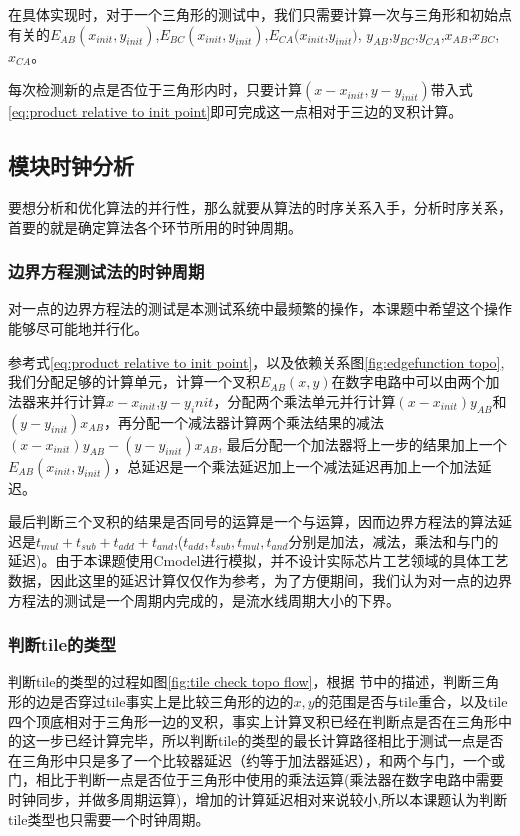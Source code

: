在具体实现时，对于一个三角形的测试中，我们只需要计算一次与三角形和初始点有关的$E_{AB}(x_{init},y_{init})$,$E_{BC}(x_{init},y_{init})$,$E_{CA}(x_{init}$,$y_{init})$,
$y_{AB}$,$y_{BC}$,$y_{CA}$,$x_{AB}$,$x_{BC}$,$x_{CA}$。

每次检测新的点是否位于三角形内时，只要计算$(x-x_{init},y-y_{init})$带入式\ref{eq:product relative to init point}即可完成这一点相对于三边的叉积计算。



\subsection{模块时钟分析}
要想分析和优化算法的并行性，那么就要从算法的时序关系入手，分析时序关系，首要的就是确定算法各个环节所用的时钟周期。

\subsubsection{边界方程测试法的时钟周期}

对一点的边界方程法的测试是本测试系统中最频繁的操作，本课题中希望这个操作能够尽可能地并行化。

参考式\ref{eq:product relative to init point}，以及依赖关系图\ref{fig:edgefunction topo},我们分配足够的计算单元，计算一个叉积$E_{AB}(x,y)$在数字电路中可以由两个加法器来并行计算$x-x_{init}$,$y-y_init$，分配两个乘法单元并行计算$(x-x_{init})y_{AB}$和$(y-y_{init})x_{AB}$，再分配一个减法器计算两个乘法结果的减法$(x-x_{init})y_{AB} - (y-y_{init})x_{AB}$, 最后分配一个加法器将上一步的结果加上一个$E_{AB}(x_{init},y_{init})$，总延迟是一个乘法延迟加上一个减法延迟再加上一个加法延迟。

最后判断三个叉积的结果是否同号的运算是一个与运算，因而边界方程法的算法延迟是$t_{mul}+t_{sub}+t_{add}+t_{and}$,($t_{add},t_{sub},t_{mul},t_{and}$分别是加法，减法，乘法和与门的延迟)。由于本课题使用Cmodel进行模拟，并不设计实际芯片工艺领域的具体工艺数据，因此这里的延迟计算仅仅作为参考，为了方便期间，我们认为对一点的边界方程法的测试是一个周期内完成的，是流水线周期大小的下界。

\subsubsection{判断tile的类型}

判断tile的类型的过程如图\ref{fig:tile check topo flow}，根据
节中的描述，判断三角形的边是否穿过tile事实上是比较三角形的边的$x,y$的范围是否与tile重合，以及tile四个顶底相对于三角形一边的叉积，事实上计算叉积已经在判断点是否在三角形中的这一步已经计算完毕，所以判断tile的类型的最长计算路径相比于测试一点是否在三角形中只是多了一个比较器延迟（约等于加法器延迟），和两个与门，一个或门，相比于判断一点是否位于三角形中使用的乘法运算(乘法器在数字电路中需要时钟同步，并做多周期运算\cite{ca})，增加的计算延迟相对来说较小,所以本课题认为判断tile类型也只需要一个时钟周期。


